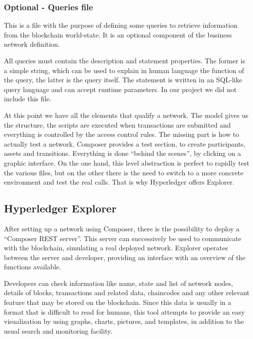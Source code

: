 \subsubsection{Optional - Queries file}
This is a file with the purpose of defining some queries to retrieve information from the blockchain world-state. It is an optional component of the business network definition. 

All queries must contain the description and statement properties. The former is a simple string, which can be used to explain in human language the function of the query, the latter is the query itself. The statement is written in an SQL-like query language and can accept runtime parameters. In our project we did not include this file.
\vspace{11pt}

At this point we have all the elements that qualify a network. The model gives us the structure, the scripts are executed when transactions are submitted and everything is controlled by the access control rules. The missing part is how to actually test a network. Composer provides a test section, to create participants, assets and transitions. Everything is done ``behind the scenes'', by clicking on a graphic interface. On the one hand, this level abstraction is perfect to rapidly test the various files, but on the other there is the need to switch to a more concrete environment and test the real calls. That is why Hyperledger offers Explorer.

\subsection{Hyperledger Explorer}
After setting up a network using Composer, there is the possibility to deploy a ``Composer REST server''. This server can successively be used to communicate with the blockchain, simulating a real deployed network. Explorer operates between the server and developer, providing an interface with an overview of the functions available. 

Developers can check information like name, state and list of network nodes, details of blocks, transactions and related data, chaincodes and any other relevant feature that may be stored on the blockchain. Since this data is usually in a format that is difficult to read for humans, this tool attempts to provide an easy visualization by using graphs, charts, pictures, and templates, in addition to the usual search and monitoring facility.

